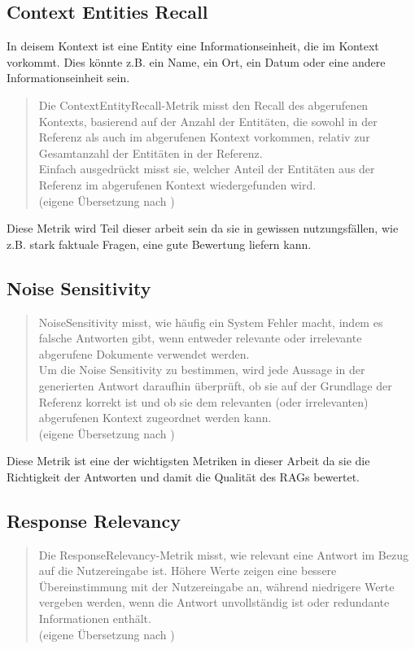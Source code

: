 \subsection{Context Entities Recall}
In deisem Kontext ist eine Entity eine Informationseinheit, die im Kontext vorkommt.
Dies könnte z.B. ein Name, ein Ort, ein Datum oder eine andere Informationseinheit sein.

\begin{quote}
Die ContextEntityRecall-Metrik misst den Recall des abgerufenen Kontexts, basierend auf der Anzahl der Entitäten, die sowohl in der Referenz als auch im abgerufenen Kontext vorkommen, relativ zur Gesamtanzahl der Entitäten in der Referenz.\\
Einfach ausgedrückt misst sie, welcher Anteil der Entitäten aus der Referenz im abgerufenen Kontext wiedergefunden wird.\\
(eigene Übersetzung nach \cite{ragas_context_entities_recall})
\end{quote}
Diese Metrik wird Teil dieser arbeit sein da sie in gewissen nutzungsfällen, wie z.B. stark faktuale Fragen, eine gute Bewertung liefern kann.

\subsection{Noise Sensitivity}
\begin{quote}
NoiseSensitivity misst, wie häufig ein System Fehler macht, indem es falsche Antworten gibt, wenn entweder relevante oder irrelevante abgerufene Dokumente verwendet werden.\\
Um die Noise Sensitivity zu bestimmen, wird jede Aussage in der generierten Antwort daraufhin überprüft, ob sie auf der Grundlage der Referenz korrekt ist und ob sie dem relevanten (oder irrelevanten) abgerufenen Kontext zugeordnet werden kann.\\
(eigene Übersetzung nach \cite{ragas_noise_sensitivity})
\end{quote}
Diese Metrik ist eine der wichtigsten Metriken in dieser Arbeit da sie die Richtigkeit der Antworten und damit die Qualität des RAGs bewertet.

\subsection{Response Relevancy}
\begin{quote}
Die ResponseRelevancy-Metrik misst, wie relevant eine Antwort im Bezug auf die Nutzereingabe ist. Höhere Werte zeigen eine bessere Übereinstimmung mit der Nutzereingabe an, während niedrigere Werte vergeben werden, wenn die Antwort unvollständig ist oder redundante Informationen enthält.\\
(eigene Übersetzung nach \cite{ragas_response_relevancy})
\end{quote}

